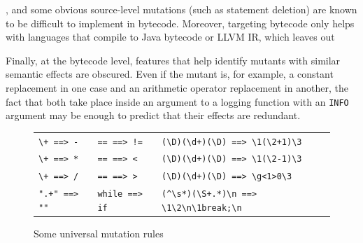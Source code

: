 , and some obvious source-level mutations (such as
statement deletion) are known to be difficult to implement in bytecode.
Moreover, targeting bytecode only helps with languages that compile to Java
bytecode or LLVM IR, which leaves out 

  Finally, at the bytecode level, features that help identify mutants with similar semantic effects are obscured.  Even if the mutant is, for example, a constant replacement in one case and an arithmetic operator replacement in another, the fact that both take place inside an argument to a logging function with an {\tt INFO} argument may be enough to predict that their effects are redundant.

\begin{figure}
\begin{tabularx}{0.75\textwidth}{XXX}
\verb|\+ ==> -| & \verb|== ==> !=| & \verb|(\D)(\d+)(\D) ==> \1(\2+1)\3|\\
\verb|\+ ==> *| & \verb|== ==> <| & \verb|(\D)(\d+)(\D) ==> \1(\2-1)\3|\\
\verb|\+ ==> /| & \verb|== ==> >| & \verb|(\D)(\d+)(\D) ==> \g<1>0\3|\\
\verb|".+" ==> ""| & \verb|while ==> if| & \verb|(^\s*)(\S+.*)\n ==> \1\2\n\1break;\n|\\
\end{tabularx}
\caption{Some universal mutation rules}
\label{fig:rules}
\end{figure}

